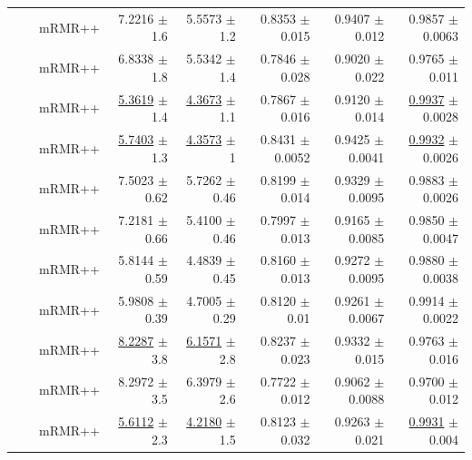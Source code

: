 \begin{longtable}{llp{}rrrrr}
 &  & mRMR++ & 7.2216 {\scriptsize $\pm$ 1.6} & 5.5573 {\scriptsize $\pm$ 1.2} & 0.8353 {\scriptsize $\pm$ 0.015} & 0.9407 {\scriptsize $\pm$ 0.012} & 0.9857 {\scriptsize $\pm$ 0.0063} \\
 &  & mRMR++ & 6.8338 {\scriptsize $\pm$ 1.8} & 5.5342 {\scriptsize $\pm$ 1.4} & 0.7846 {\scriptsize $\pm$ 0.028} & 0.9020 {\scriptsize $\pm$ 0.022} & 0.9765 {\scriptsize $\pm$ 0.011} \\
 &  & mRMR++ & \underline{5.3619} {\scriptsize $\pm$ 1.4} & \underline{4.3673} {\scriptsize $\pm$ 1.1} & 0.7867 {\scriptsize $\pm$ 0.016} & 0.9120 {\scriptsize $\pm$ 0.014} & \underline{0.9937} {\scriptsize $\pm$ 0.0028} \\
 &  & mRMR++ & \underline{5.7403} {\scriptsize $\pm$ 1.3} & \underline{4.3573} {\scriptsize $\pm$ 1} & 0.8431 {\scriptsize $\pm$ 0.0052} & 0.9425 {\scriptsize $\pm$ 0.0041} & \underline{0.9932} {\scriptsize $\pm$ 0.0026} \\
 &  & mRMR++ & 7.5023 {\scriptsize $\pm$ 0.62} & 5.7262 {\scriptsize $\pm$ 0.46} & 0.8199 {\scriptsize $\pm$ 0.014} & 0.9329 {\scriptsize $\pm$ 0.0095} & 0.9883 {\scriptsize $\pm$ 0.0026} \\
 &  & mRMR++ & 7.2181 {\scriptsize $\pm$ 0.66} & 5.4100 {\scriptsize $\pm$ 0.46} & 0.7997 {\scriptsize $\pm$ 0.013} & 0.9165 {\scriptsize $\pm$ 0.0085} & 0.9850 {\scriptsize $\pm$ 0.0047} \\
 &  & mRMR++ & 5.8144 {\scriptsize $\pm$ 0.59} & 4.4839 {\scriptsize $\pm$ 0.45} & 0.8160 {\scriptsize $\pm$ 0.013} & 0.9272 {\scriptsize $\pm$ 0.0095} & 0.9880 {\scriptsize $\pm$ 0.0038} \\
 &  & mRMR++ & 5.9808 {\scriptsize $\pm$ 0.39} & 4.7005 {\scriptsize $\pm$ 0.29} & 0.8120 {\scriptsize $\pm$ 0.01} & 0.9261 {\scriptsize $\pm$ 0.0067} & 0.9914 {\scriptsize $\pm$ 0.0022} \\
 &  & mRMR++ & \underline{8.2287} {\scriptsize $\pm$ 3.8} & \underline{6.1571} {\scriptsize $\pm$ 2.8} & 0.8237 {\scriptsize $\pm$ 0.023} & 0.9332 {\scriptsize $\pm$ 0.015} & 0.9763 {\scriptsize $\pm$ 0.016} \\
 &  & mRMR++ & 8.2972 {\scriptsize $\pm$ 3.5} & 6.3979 {\scriptsize $\pm$ 2.6} & 0.7722 {\scriptsize $\pm$ 0.012} & 0.9062 {\scriptsize $\pm$ 0.0088} & 0.9700 {\scriptsize $\pm$ 0.012} \\
 &  & mRMR++ & \underline{5.6112} {\scriptsize $\pm$ 2.3} & \underline{4.2180} {\scriptsize $\pm$ 1.5} & 0.8123 {\scriptsize $\pm$ 0.032} & 0.9263 {\scriptsize $\pm$ 0.021} & \underline{0.9931} {\scriptsize $\pm$ 0.004} \\

\end{longtable}
